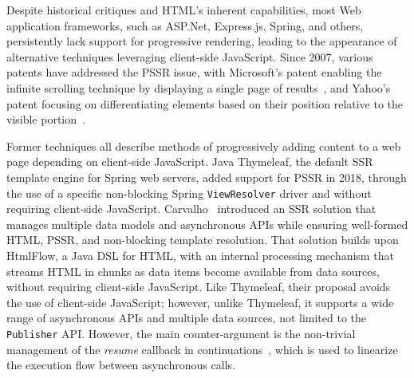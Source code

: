 Despite historical critiques and HTML's inherent capabilities, most Web
application frameworks, such as ASP.Net, Express.js, Spring, and others,
persistently lack support for progressive rendering, leading to the appearance
of alternative techniques leveraging client-side JavaScript. Since 2007,
various patents have addressed the PSSR issue, with Microsoft's patent enabling
the infinite scrolling technique by displaying a single page of
results~\cite{scroll2007}, and Yahoo's patent focusing on differentiating
elements based on their position relative to the visible
portion~\cite{schiller2007progressive}.

Former techniques all describe methods of progressively adding content to a web
page depending on client-side JavaScript.
Java Thymeleaf, the default SSR template engine for Spring web servers,
added support for PSSR in 2018, through the use of a specific non-blocking
Spring \texttt{ViewResolver} driver and without requiring client-side
JavaScript.
Carvalho~\cite{carvalho2023async} introduced an SSR solution that manages
multiple data models and asynchronous APIs while ensuring well-formed HTML,
PSSR, and non-blocking template resolution. That solution builds upon HtmlFlow,
a Java DSL for HTML, with an internal processing mechanism that streams HTML in
chunks as data items become available from data sources, without requiring
client-side JavaScript. Like Thymeleaf, their proposal avoids the use of
client-side JavaScript; however, unlike Thymeleaf, it supports a wide range of
asynchronous APIs and multiple data sources, not limited to the
\texttt{Publisher} API. However, the main counter-argument is the non-trivial
management of the \emph{resume} callback in
continuations~\cite{von2003events,callbackhell}, which is used to linearize the
execution flow between asynchronous calls.